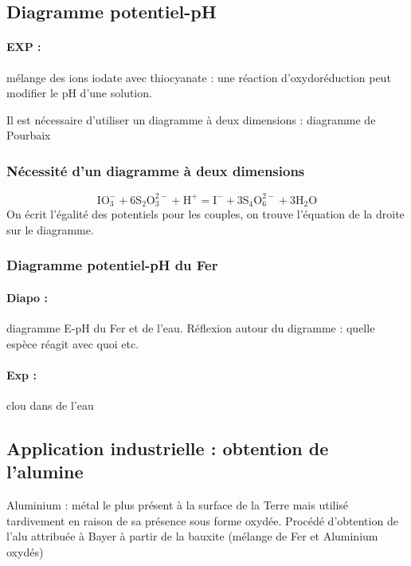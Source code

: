 \subsection{Diagramme potentiel-pH}

\paragraph{EXP :} mélange des ions iodate avec thiocyanate : une réaction d'oxydoréduction peut modifier le pH d'une solution.

Il est nécessaire d'utiliser un diagramme à deux dimensions : diagramme de Pourbaix

\subsubsection{Nécessité d'un diagramme à deux dimensions}

\begin{equation}
\mathrm{IO_3^-+6S_2O_3^{2-} + H^+ = I^- + 3S_4O_6^{2-}+3H_2O}
\end{equation}
On écrit l'égalité des potentiels pour les couples, on trouve l'équation de la droite sur le diagramme.

\subsubsection{Diagramme potentiel-pH du Fer}

\paragraph{Diapo :} diagramme E-pH du Fer et de l'eau.
Réflexion autour du digramme : quelle espèce réagit avec quoi etc. 

\paragraph{Exp : } clou dans de l'eau

\subsection{Application industrielle : obtention de l'alumine}

Aluminium : métal le plus présent à la surface de la Terre mais utilisé tardivement en raison de sa présence sous forme oxydée.
Procédé d'obtention de l'alu attribuée à Bayer à partir de la bauxite (mélange de Fer et Aluminium oxydés)

